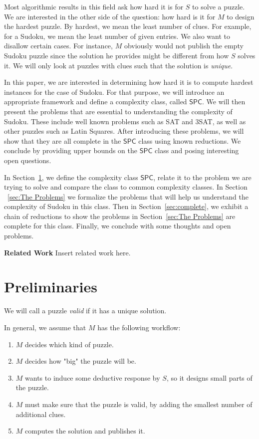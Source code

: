 \documentclass[runningheads,a4paper]{llncs}
\begin{document}
Most algorithmic results in this field ask how hard it is for $S$ to solve a puzzle. We are interested in the other side of the question: how hard is it for $M$ to design the hardest puzzle. By hardest, we mean the least number of clues. For example, for a Sudoku, we mean the least number of given entries. We also want to disallow certain cases. For instance, $M$ obviously would not publish the empty Sudoku puzzle since the solution he provides might be different from how $S$ solves it. We will only look at puzzles with clues such that the solution is \emph{unique}.

In this paper, we are interested in determining how hard it is to compute hardest instances for the case of Sudoku. For that purpose, we will introduce an appropriate framework and define a complexity class, called $\mathsf{SPC}$. We will then present the problems that are essential to understanding the complexity of Sudoku. These include well known problems such as SAT and 3SAT, as well as other puzzles such as Latin Squares. After introducing these problems, we will show that they are all complete in the $\mathsf{SPC}$ class using known reductions. We conclude by providing upper bounds on the $\mathsf{SPC}$ class and posing interesting open questions. 

In Section~\ref{sec:prelim}, we define the complexity class $\mathsf{SPC}$, relate it to the problem we are trying to solve and compare the class to common complexity classes. In Section ~\ref{sec:The Problems} we formalize the problems that will help us understand the complexity of Sudoku in this class. Then in Section~\ref{sec:complete}, we exhibit a chain of reductions to show the problems in Section~\ref{sec:The Problems} are complete for this class. Finally, we conclude with some thoughts and open problems.

\textbf{Related Work} Insert related work here. 

\section{Preliminaries}
\label{sec:prelim}

\begin{definition}
We will call a puzzle \emph{valid} if it has a unique solution.
\end{definition}

In general, we assume that $M$ has the following workflow:
\begin{enumerate}
\item $M$ decides which kind of puzzle.
\item $M$ decides how "big" the puzzle will be.
\item $M$ wants to induce some deductive response by $S$, so it designs small parts of the puzzle.
\item $M$ must make sure that the puzzle is valid, by adding the smallest number of additional clues.
\item $M$ computes the solution and publishes it. 
\end{enumerate}
\end{document}

